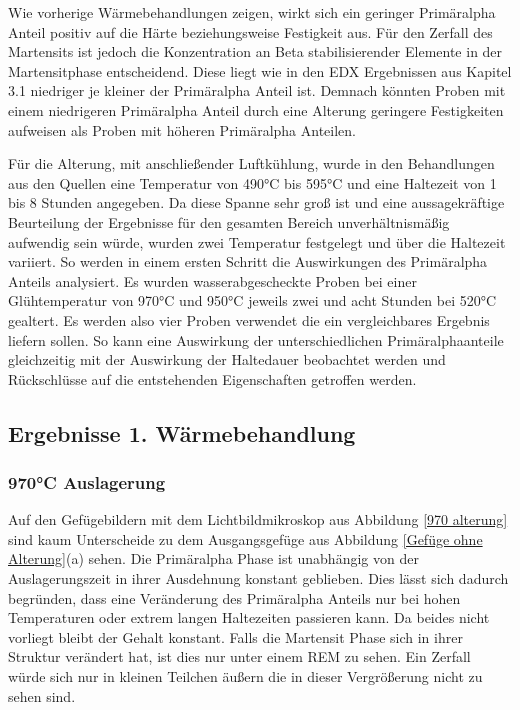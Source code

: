 \documentclass[a4paper, 11pt]{tubsreprt}
\begin{document}
Wie vorherige Wärmebehandlungen zeigen, wirkt sich ein geringer Primäralpha Anteil positiv auf die Härte beziehungsweise Festigkeit aus. Für den Zerfall des Martensits ist jedoch die Konzentration an Beta stabilisierender Elemente in der Martensitphase entscheidend. Diese liegt wie in den EDX Ergebnissen aus Kapitel 3.1 niedriger je kleiner der Primäralpha Anteil ist. Demnach könnten Proben mit einem niedrigeren Primäralpha Anteil durch eine Alterung geringere Festigkeiten aufweisen als Proben mit höheren Primäralpha Anteilen.

Für die Alterung, mit anschließender Luftkühlung, wurde in den Behandlungen aus den Quellen eine Temperatur von 490°C bis 595°C und eine Haltezeit von 1 bis 8 Stunden angegeben. Da diese Spanne sehr groß ist und eine aussagekräftige Beurteilung der Ergebnisse für den gesamten Bereich unverhältnismäßig aufwendig sein würde, wurden zwei Temperatur festgelegt und über die Haltezeit variiert. So werden in einem ersten Schritt die Auswirkungen des Primäralpha Anteils analysiert. Es wurden wasserabgescheckte Proben bei einer Glühtemperatur von 970°C und 950°C jeweils zwei und acht Stunden bei 520°C gealtert. Es werden also vier Proben verwendet die ein vergleichbares Ergebnis liefern sollen. So kann eine Auswirkung der unterschiedlichen Primäralphaanteile gleichzeitig mit der Auswirkung der Haltedauer beobachtet werden und Rückschlüsse auf die entstehenden Eigenschaften getroffen werden.
\subsection{Ergebnisse 1. Wärmebehandlung}
\subsubsection{970°C Auslagerung}
Auf den Gefügebildern mit dem Lichtbildmikroskop aus Abbildung \ref{970 alterung} sind kaum Unterscheide zu dem Ausgangsgefüge aus Abbildung \ref{Gefüge ohne Alterung}(a) sehen. Die Primäralpha Phase ist unabhängig von der Auslagerungszeit in ihrer Ausdehnung konstant geblieben. Dies lässt sich dadurch begründen, dass eine Veränderung des Primäralpha Anteils nur bei hohen Temperaturen oder extrem langen Haltezeiten passieren kann. Da beides nicht vorliegt bleibt der Gehalt konstant. Falls die Martensit Phase sich in ihrer Struktur verändert hat, ist dies nur unter einem REM zu sehen. Ein Zerfall würde sich nur in kleinen Teilchen äußern die in dieser Vergrößerung nicht zu sehen sind.
\end{document}
